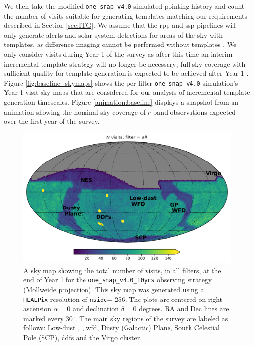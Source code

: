 \documentclass[preprintm,linenumbers]{aastex631}
\newcommand{\baseline}{\texttt{one\_snap\_v4.0}\xspace}
\newcommand{\baselinefull}{\texttt{one\_snap\_v4.0\_10yrs}\xspace}
\newcommand{\nside}{\texttt{nside}\xspace}
\newcommand{\healpix}{\texttt{HEALPix}\xspace} %
\begin{document}
	We then take the modified  \baseline simulated pointing history and count the number of visits suitable for generating templates matching our requirements described in Section \ref{sec:ITG}. 
 We assume that the \gls*{rpp} and \gls*{ssp} pipelines will only generate alerts and solar system detections for areas of the sky with templates, as difference imaging cannot be performed without templates \citep{DMTN-107}. 
 We only consider visits during Year 1 of the survey as after this time an interim incremental template strategy will no longer be necessary; full sky coverage with sufficient quality for template generation is expected to be achieved after Year 1 \citep{RTN-011}. 
 Figure \ref{fig:baseline_skymaps} shows the per filter \baseline simulation's Year 1 visit sky maps that are considered for our analysis of incremental template generation timescales. 
 Figure \ref{animation:baseline} displays a snapshot from an animation showing the nominal sky coverage of $r$-band observations expected over the first year of the survey.

		\begin{figure}
			\begin{center}
				\includegraphics[width=0.6\columnwidth]{results/skymaps/skymap_first_year_one_snap_v4_0_10yrs_nside-256_CountMetric_all_noDD_noTwi.pdf}
				\caption{A sky map showing the total number of visits, in all filters, at the end of Year 1 for the \baselinefull observing strategy (Mollweide projection). 
    This sky map was generated using a \healpix \citep[Hierarchical Equal Area isoLatitude Pixelization; ][]{2005ApJ...622..759G}  resolution of \nside = 256.
    The plots are centered on right ascension $\alpha = 0$ and declination $\delta = 0$ degrees. RA and Dec lines are marked every 30$^\circ$.
    The main sky regions of the survey are labeled as follows: Low-dust , ,  \gls*{wfd}, Dusty (Galactic) Plane, South Celestial Pole (SCP), \glspl*{ddf} and the Virgo cluster.
    }
    \label{fig:baseline_labels}
			\end{center}
		\end{figure}
  
\end{document}
